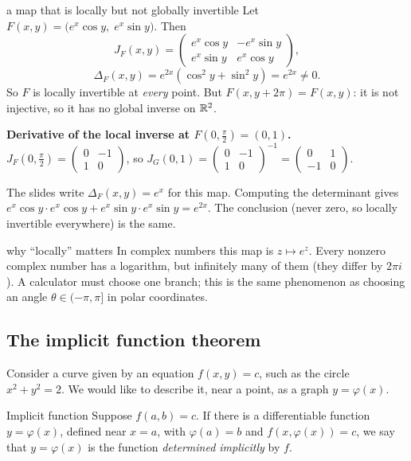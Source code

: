 \begin{example}{a map that is locally but not globally invertible}
Let $F(x,y)=\big(e^x\cos y,\;e^x\sin y\big)$. Then
\[ J_F(x,y)=\begin{pmatrix}e^x\cos y&-e^x\sin y\\ e^x\sin y&e^x\cos y\end{pmatrix}, \]
\[ \Delta_F(x,y)=e^{2x}(\cos^2y+\sin^2y)=e^{2x}\neq0 . \]
So $F$ is locally invertible at \emph{every} point. But $F(x,y+2\pi)=F(x,y)$: it is not injective,
so it has no global inverse on $\mathbb{R}^2$.

\textbf{Derivative of the local inverse at $F(0,\frac\pi2)=(0,1)$.}
$J_F(0,\frac\pi2)=\begin{pmatrix}0&-1\\1&0\end{pmatrix}$, so
$J_G(0,1)=\begin{pmatrix}0&-1\\1&0\end{pmatrix}^{-1}=\begin{pmatrix}0&1\\-1&0\end{pmatrix}$.
\end{example}

\begin{trap}
The slides write $\Delta_F(x,y)=e^x$ for this map. Computing the determinant gives
$e^x\cos y\cdot e^x\cos y+e^x\sin y\cdot e^x\sin y=e^{2x}$. The conclusion (never zero, so locally
invertible everywhere) is the same.
\end{trap}

\begin{reallife}{why ``locally'' matters}
In complex numbers this map is $z\mapsto e^z$. Every nonzero complex number has a logarithm, but
infinitely many of them (they differ by $2\pi i$). A calculator must choose one branch; this is the
same phenomenon as choosing an angle $\theta\in(-\pi,\pi]$ in polar coordinates.
\end{reallife}

\subsection{The implicit function theorem}

Consider a curve given by an equation $f(x,y)=c$, such as the circle $x^2+y^2=2$. We would like
to describe it, near a point, as a graph $y=\varphi(x)$.

\begin{definition}{Implicit function}
Suppose $f(a,b)=c$. If there is a differentiable function $y=\varphi(x)$, defined near $x=a$,
with $\varphi(a)=b$ and $f(x,\varphi(x))=c$, we say that $y=\varphi(x)$ is the function
\emph{determined implicitly} by $f$.
\end{definition}

